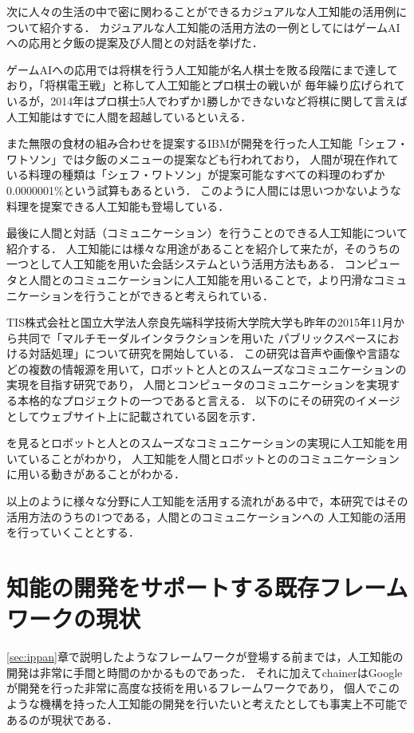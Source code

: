 次に人々の生活の中で密に関わることができるカジュアルな人工知能の活用例について紹介する．
カジュアルな人工知能の活用方法の一例としてにはゲームAIへの応用と夕飯の提案及び人間との対話を挙げた．

ゲームAIへの応用では将棋を行う人工知能が名人棋士を敗る段階にまで達しており，「将棋電王戦」と称して人工知能とプロ棋士の戦いが
毎年繰り広げられているが，2014年はプロ棋士5人でわずか1勝しかできないなど将棋に関して言えば人工知能はすでに人間を超越しているといえる．

また無限の食材の組み合わせを提案するIBMが開発を行った人工知能「シェフ・ワトソン」では夕飯のメニューの提案なども行われており，
人間が現在作れている料理の種類は「シェフ・ワトソン」が提案可能なすべての料理のわずか0.0000001\%という試算もあるという．
このように人間には思いつかないような料理を提案できる人工知能も登場している．

最後に人間と対話（コミュニケーション）を行うことのできる人工知能について紹介する．
人工知能には様々な用途があることを紹介して来たが，そのうちの一つとして人工知能を用いた会話システムという活用方法もある．
コンピュータと人間とのコミュニケーションに人工知能を用いることで，より円滑なコミュニケーションを行うことができると考えられている．

TIS株式会社と国立大学法人奈良先端科学技術大学院大学も昨年の2015年11月から共同で「マルチモーダルインタラクションを用いた
パブリックスペースにおける対話処理」について研究を開始している．\cite{tis}
この研究は音声や画像や言語などの複数の情報源を用いて，ロボットと人とのスムーズなコミュニケーションの実現を目指す研究であり，
人間とコンピュータのコミュニケーションを実現する本格的なプロジェクトの一つであると言える．
以下のにその研究のイメージとしてウェブサイト上に記載されている図を示す．


を見るとロボットと人とのスムーズなコミュニケーションの実現に人工知能を用いていることがわかり，
人工知能を人間とロボットとののコミュニケーションに用いる動きがあることがわかる．

以上のように様々な分野に人工知能を活用する流れがある中で，本研究ではその活用方法のうちの1つである，人間とのコミュニケーションへの
人工知能の活用を行っていくこととする．

\section{知能の開発をサポートする既存フレームワークの現状}
\ref{sec:ippan}章で説明したようなフレームワークが登場する前までは，人工知能の開発は非常に手間と時間のかかるものであった．
それに加えてchainerはGoogleが開発を行った非常に高度な技術を用いるフレームワークであり，
個人でこのような機構を持った人工知能の開発を行いたいと考えたとしても事実上不可能であるのが現状である．

